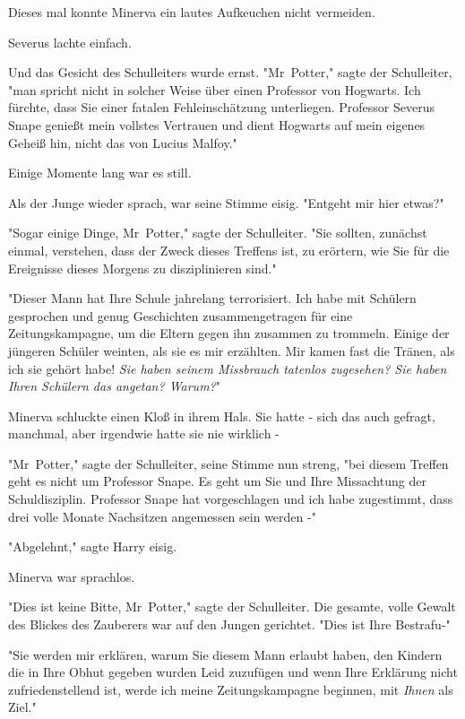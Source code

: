 {Dieses mal konnte Minerva ein lautes Aufkeuchen nicht vermeiden.

Severus lachte einfach.

Und das Gesicht des Schulleiters wurde ernst. "Mr~Potter," sagte der Schulleiter, "man spricht nicht in solcher Weise über einen Professor von Hogwarts. Ich fürchte, dass Sie einer fatalen Fehleinschätzung unterliegen. Professor Severus Snape genießt mein vollstes Vertrauen und dient Hogwarts auf mein eigenes Geheiß hin, nicht das von Lucius Malfoy."

Einige Momente lang war es still.

Als der Junge wieder sprach, war seine Stimme eisig. "Entgeht mir hier etwas?"

"Sogar einige Dinge, Mr~Potter," sagte der Schulleiter. "Sie sollten, zunächst einmal, verstehen, dass der Zweck dieses Treffens ist, zu erörtern, wie Sie für die Ereignisse dieses Morgens zu disziplinieren sind."

"Dieser Mann hat Ihre Schule jahrelang terrorisiert. Ich habe mit Schülern gesprochen und genug Geschichten zusammengetragen für eine Zeitungskampagne, um die Eltern gegen ihn zusammen zu trommeln. Einige der jüngeren Schüler weinten, als sie es mir erzählten. Mir kamen fast die Tränen, als ich sie gehört habe! \emph{Sie haben seinem Missbrauch tatenlos zugesehen? Sie haben Ihren Schülern das angetan? Warum?}"

Minerva schluckte einen Kloß in ihrem Hals. Sie hatte - sich das auch gefragt, manchmal, aber irgendwie hatte sie nie wirklich -

"Mr~Potter," sagte der Schulleiter, seine Stimme nun streng, "bei diesem Treffen geht es nicht um Professor Snape. Es geht um Sie und Ihre Missachtung der Schuldisziplin. Professor Snape hat vorgeschlagen und ich habe zugestimmt, dass drei volle Monate Nachsitzen angemessen sein werden -"

"Abgelehnt," sagte Harry eisig.

Minerva war sprachlos.

"Dies ist keine Bitte, Mr~Potter," sagte der Schulleiter. Die gesamte, volle Gewalt des Blickes des Zauberers war auf den Jungen gerichtet. "Dies ist Ihre Bestrafu-"

"Sie werden mir erklären, warum Sie diesem Mann erlaubt haben, den Kindern die in Ihre Obhut gegeben wurden Leid zuzufügen und wenn Ihre Erklärung nicht zufriedenstellend ist, werde ich meine Zeitungskampagne beginnen, mit \emph{Ihnen} als Ziel."

}
